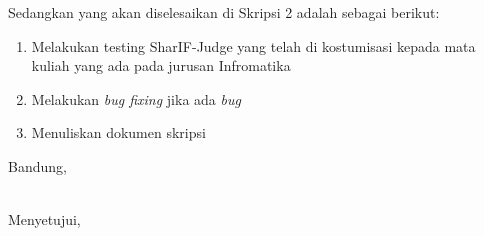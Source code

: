\documentclass[a4paper,twoside]{article}
\begin{document}
Sedangkan yang akan diselesaikan di Skripsi 2 adalah sebagai berikut:
\begin{enumerate}
\item Melakukan testing SharIF-Judge yang telah di kostumisasi kepada mata kuliah yang ada pada jurusan Infromatika
\item Melakukan \textit{bug fixing} jika ada \textit{bug}
\item Menuliskan dokumen skripsi
\end{enumerate}

\vspace{1cm}
\centering Bandung, \tanggal\\
\vspace{2cm} \nama \\ 
\vspace{1cm}

Menyetujui, \\
\end{document}
